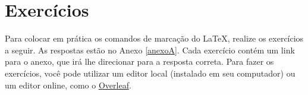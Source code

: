 %
%

\section{Exercícios}
\label{sec:exercicios}

Para colocar em prática os comandos de marcação do \LaTeX{}, realize os exercícios a seguir. As respostas estão no Anexo \ref{anexoA}. Cada exercício contém um link para o anexo, que irá lhe direcionar para a resposta correta. Para fazer os exercícios, você pode utilizar um editor local (instalado em seu computador) ou um editor online, como o \href{https://pt.overleaf.com/project}{Overleaf}.

